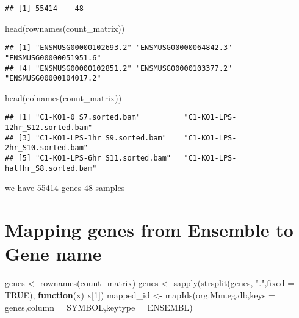 \documentclass[
]{article}
\newenvironment{Shaded}{\begin{snugshade}}{\end{snugshade}}
\newcommand{\AttributeTok}[1]{\textcolor[rgb]{0.77,0.63,0.00}{#1}}
\newcommand{\ConstantTok}[1]{\textcolor[rgb]{0.00,0.00,0.00}{#1}}
\newcommand{\ControlFlowTok}[1]{\textcolor[rgb]{0.13,0.29,0.53}{\textbf{#1}}}
\newcommand{\DecValTok}[1]{\textcolor[rgb]{0.00,0.00,0.81}{#1}}
\newcommand{\FunctionTok}[1]{\textcolor[rgb]{0.00,0.00,0.00}{#1}}
\newcommand{\NormalTok}[1]{#1}
\newcommand{\OtherTok}[1]{\textcolor[rgb]{0.56,0.35,0.01}{#1}}
\newcommand{\StringTok}[1]{\textcolor[rgb]{0.31,0.60,0.02}{#1}}
\begin{document}
\begin{verbatim}
## [1] 55414    48
\end{verbatim}

\begin{Shaded}
\begin{Highlighting}[]
\FunctionTok{head}\NormalTok{(}\FunctionTok{rownames}\NormalTok{(count\_matrix))}
\end{Highlighting}
\end{Shaded}

\begin{verbatim}
## [1] "ENSMUSG00000102693.2" "ENSMUSG00000064842.3" "ENSMUSG00000051951.6"
## [4] "ENSMUSG00000102851.2" "ENSMUSG00000103377.2" "ENSMUSG00000104017.2"
\end{verbatim}

\begin{Shaded}
\begin{Highlighting}[]
\FunctionTok{head}\NormalTok{(}\FunctionTok{colnames}\NormalTok{(count\_matrix))}
\end{Highlighting}
\end{Shaded}

\begin{verbatim}
## [1] "C1-KO1-0_S7.sorted.bam"          "C1-KO1-LPS-12hr_S12.sorted.bam" 
## [3] "C1-KO1-LPS-1hr_S9.sorted.bam"    "C1-KO1-LPS-2hr_S10.sorted.bam"  
## [5] "C1-KO1-LPS-6hr_S11.sorted.bam"   "C1-KO1-LPS-halfhr_S8.sorted.bam"
\end{verbatim}

we have 55414 genes 48 samples

\hypertarget{mapping-genes-from-ensemble-to-gene-name}{%
\section{Mapping genes from Ensemble to Gene
name}\label{mapping-genes-from-ensemble-to-gene-name}}

\begin{Shaded}
\begin{Highlighting}[]
\NormalTok{genes }\OtherTok{\textless{}{-}} \FunctionTok{rownames}\NormalTok{(count\_matrix)}
\NormalTok{genes }\OtherTok{\textless{}{-}} \FunctionTok{sapply}\NormalTok{(}\FunctionTok{strsplit}\NormalTok{(genes, }\StringTok{"."}\NormalTok{,}\AttributeTok{fixed =} \ConstantTok{TRUE}\NormalTok{), }\ControlFlowTok{function}\NormalTok{(x) x[}\DecValTok{1}\NormalTok{])}
\NormalTok{mapped\_id }\OtherTok{\textless{}{-}} \FunctionTok{mapIds}\NormalTok{(org.Mm.eg.db,}\AttributeTok{keys =}\NormalTok{ genes,}\AttributeTok{column =} \StringTok{\textquotesingle{}SYMBOL\textquotesingle{}}\NormalTok{,}\AttributeTok{keytype =} \StringTok{\textquotesingle{}ENSEMBL\textquotesingle{}}\NormalTok{)}
\end{Highlighting}
\end{Shaded}
\end{document}

